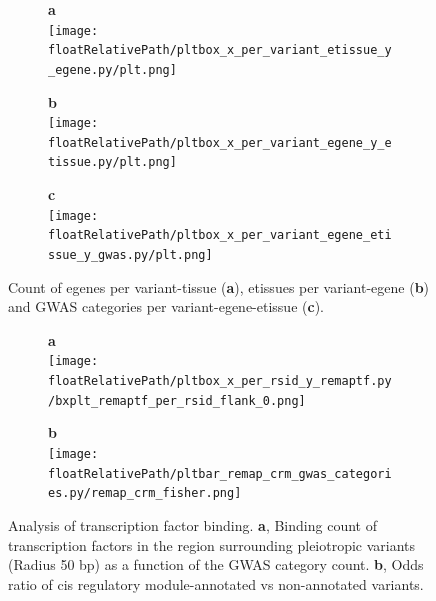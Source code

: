 %
%

\begin{figure}[!]
\centering
%
\begin{subfigure}[]{.33\textwidth}
\textbf{a}
\\
\texttt{[image: \\floatRelativePath/pltbox\_x\_per\_variant\_etissue\_y\_egene.py/plt.png]}
\end{subfigure}
%
\begin{subfigure}[]{.33\textwidth}
\textbf{b}
\\
\texttt{[image: \\floatRelativePath/pltbox\_x\_per\_variant\_egene\_y\_etissue.py/plt.png]}
\end{subfigure}
%
\begin{subfigure}[]{.33\textwidth}
\textbf{c}
\\
\texttt{[image: \\floatRelativePath/pltbox\_x\_per\_variant\_egene\_etissue\_y\_gwas.py/plt.png]}
\end{subfigure}
%
\caption{Count of egenes per variant-tissue (\textbf{a}), etissues per variant-egene (\textbf{b}) and GWAS categories per variant-egene-etissue (\textbf{c}).} \label{fig:gwas_egene_etisue_per_variant}
%
\end{figure}

%
%

\begin{figure}[!]
\centering
%
\begin{subfigure}[]{.33\textwidth}
\textbf{a}
\\
\texttt{[image: \\floatRelativePath/pltbox\_x\_per\_rsid\_y\_remaptf.py/bxplt\_remaptf\_per\_rsid\_flank\_0.png]}
\end{subfigure}
%
\begin{subfigure}[]{.33\textwidth}
\textbf{b}
\\
\texttt{[image: \\floatRelativePath/pltbar\_remap\_crm\_gwas\_categories.py/remap\_crm\_fisher.png]}
\end{subfigure}
%
\caption{Analysis of transcription factor binding. \textbf{a}, Binding count of transcription factors in the region surrounding pleiotropic variants (Radius 50 bp) as a function of the GWAS category count. \textbf{b}, Odds ratio of cis regulatory module-annotated vs non-annotated variants.} \label{fig:freq_tf_per_variant}
%
\end{figure}


